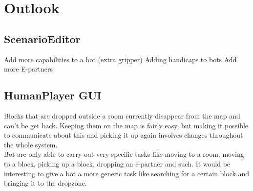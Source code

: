 \documentclass{article}
\begin{document}
\section*{Outlook}

\subsection*{ScenarioEditor}
Add more capabilities to a bot (extra gripper)
Adding handicaps to bots
Add more E-partners

\subsection*{HumanPlayer GUI}
Blocks that are dropped outside a room currently disappear from the map and can't be get back. Keeping them on the map is fairly easy, but making it possible to communicate about this and picking it up again involves changes throughout the whole system. \\
Bot are only able to carry out very specific tasks like moving to a room, moving to a block, picking up a block, dropping an e-partner and such. It would be interesting to give a bot a more generic task like searching for a certain block and bringing it to the dropzone.
\end{document}

